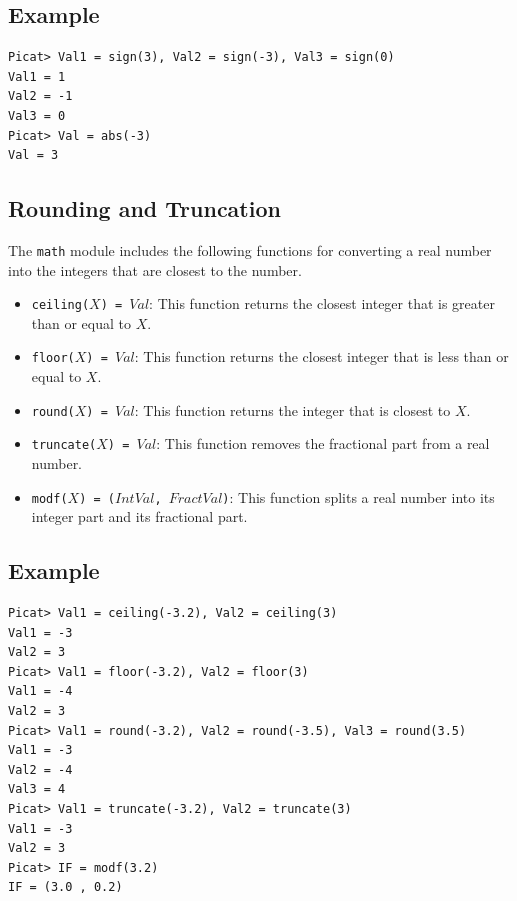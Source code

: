 \subsection*{Example}
\begin{verbatim}
Picat> Val1 = sign(3), Val2 = sign(-3), Val3 = sign(0)
Val1 = 1
Val2 = -1
Val3 = 0
Picat> Val = abs(-3)
Val = 3
\end{verbatim}

\subsection{Rounding and Truncation}
The \texttt{math} module includes the following functions for converting a real number into the integers that are closest to the number.
\begin{itemize}
\item \texttt{ceiling($X$) = $Val$}: This function returns the closest integer that is greater than or equal to $X$.
\item \texttt{floor($X$) = $Val$}: This function returns the closest integer that is less than or equal to $X$.
\item \texttt{round($X$) = $Val$}: This function returns the integer that is closest to $X$.
\item \texttt{truncate($X$) = $Val$}: This function removes the fractional part from a real number.  
\item \texttt{modf($X$) = ($IntVal$, $FractVal$)}: This function splits a real number into its integer part and its fractional part.
\end{itemize}

\subsection*{Example}
\begin{verbatim}
Picat> Val1 = ceiling(-3.2), Val2 = ceiling(3)
Val1 = -3
Val2 = 3
Picat> Val1 = floor(-3.2), Val2 = floor(3)
Val1 = -4
Val2 = 3
Picat> Val1 = round(-3.2), Val2 = round(-3.5), Val3 = round(3.5)
Val1 = -3
Val2 = -4
Val3 = 4
Picat> Val1 = truncate(-3.2), Val2 = truncate(3)
Val1 = -3
Val2 = 3
Picat> IF = modf(3.2)
IF = (3.0 , 0.2)
\end{verbatim}

